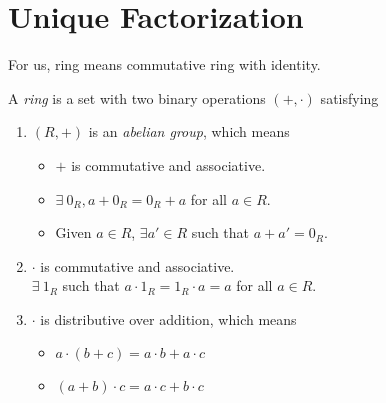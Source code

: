 \documentclass{mynotes}
\begin{document}
\tableofcontents
\chapter{Unique Factorization}
For us, ring means commutative ring with identity.
\begin{definition}
A \emph{ring} is a set with two binary operations $(+,\cdot)$ satisfying
\begin{enumerate}
\item $(R,+)$ is an \emph{abelian group}, which means
\begin{itemize}
\item $+$ is commutative and associative.
\item $\exists\ 0_R, a+0_R=0_R+a$ for all $a\in R$.
\item Given $a\in R$, $\exists a'\in R$ such that $a+a'=0_R$.
\end{itemize}
\item 
$\cdot$ is commutative and associative.\\
$\exists\ 1_R$ such that $a\cdot 1_R=1_R\cdot a =a$ for all $a\in R$.
\item $\cdot$ is distributive over addition, which means
\begin{itemize}
\item $a\cdot(b+c) = a\cdot b+a\cdot c$
\item $(a+b)\cdot c = a\cdot c +b\cdot c$
\end{itemize}
\end{enumerate}
\end{definition}
\end{document}
